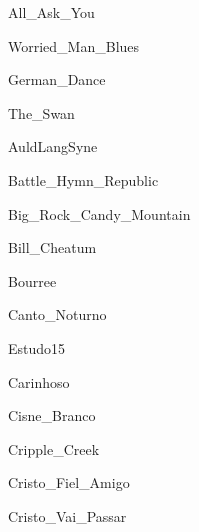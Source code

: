 \documentclass{scrartcl}
\begin{document}

{All_Ask_You}


{Worried_Man_Blues}


{German_Dance}


{The_Swan}


{AuldLangSyne}


{Battle_Hymn_Republic}


{Big_Rock_Candy_Mountain}


{Bill_Cheatum}


{Bourree}


{Canto_Noturno}


{Estudo15}


{Carinhoso}


{Cisne_Branco}


{Cripple_Creek}


{Cristo_Fiel_Amigo}


{Cristo_Vai_Passar}
\end{document}
